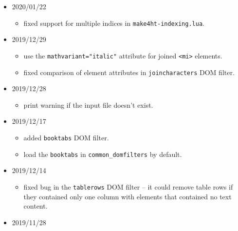 \begin{itemize}
  \begin{itemize}
  \tightlist
  \item
    version \texttt{0.3d} released.
  \item
    added \texttt{Make:httex} command for Plain TeX support.
  \item
    added \texttt{detect\_engine} extension. It supports detection of
    the used engine and format from TeX Shop or TeXWorks magic comments.
    These comments can look like:
    \texttt{\%!TEX\ TS-program\ =\ xelatex}.
  \end{itemize}
\item
  2020/01/22

  \begin{itemize}
  \tightlist
  \item
    fixed support for multiple indices in \texttt{make4ht-indexing.lua}.
  \end{itemize}
\item
  2019/12/29

  \begin{itemize}
  \tightlist
  \item
    use the \texttt{mathvariant="italic"} attribute for joined
    \texttt{\textless{}mi\textgreater{}} elements.
  \item
    fixed comparison of element attributes in \texttt{joincharacters}
    DOM filter.
  \end{itemize}
\item
  2019/12/28

  \begin{itemize}
  \tightlist
  \item
    print warning if the input file doesn't exist.
  \end{itemize}
\item
  2019/12/17

  \begin{itemize}
  \tightlist
  \item
    added \texttt{booktabs} DOM filter.
  \item
    load the \texttt{booktabs} in \texttt{common\_domfilters} by
    default.
  \end{itemize}
\item
  2019/12/14

  \begin{itemize}
  \tightlist
  \item
    fixed bug in the \texttt{tablerows} DOM filter -- it could remove
    table rows if they contained only one column with elements that
    contained no text content.
  \end{itemize}
\item
  2019/11/28


\end{itemize}
